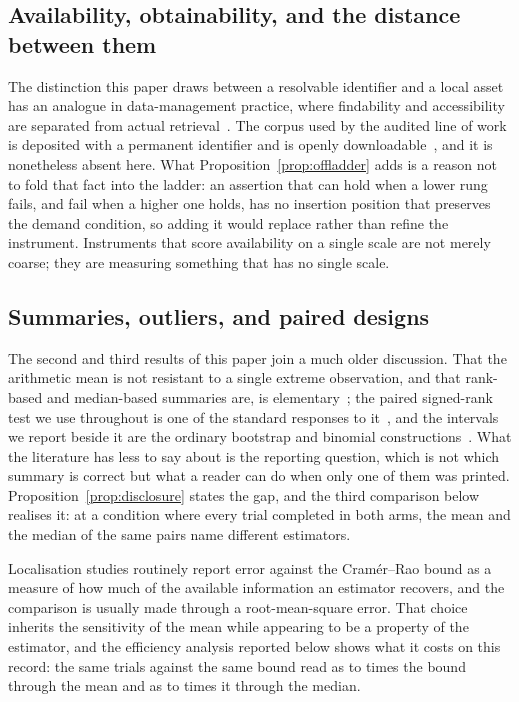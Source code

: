 \subsection{Availability, obtainability, and the distance between them}

The distinction this paper draws between a resolvable identifier and a local
asset has an analogue in data-management practice, where findability and
accessibility are separated from actual retrieval~\cite{wilkinson2016fair}. The
corpus used by the audited line of work is deposited with a permanent identifier
and is openly downloadable~\cite{locata,lollmann2018locata}, and it is
nonetheless absent here. What
Proposition~\ref{prop:offladder} adds is a reason not to fold that fact into the
ladder: an assertion that can hold when a lower rung fails, and fail when a
higher one holds, has no insertion position that preserves the demand
condition, so adding it would replace rather than refine the instrument.
Instruments that score availability on a single scale are not merely coarse;
they are measuring something that has no single scale.

\subsection{Summaries, outliers, and paired designs}

The second and third results of this paper join a much older discussion. That
the arithmetic mean is not resistant to a single extreme observation, and that
rank-based and median-based summaries are, is elementary~\cite{huber1964robust};
the paired signed-rank test we use throughout is one of the standard responses
to it~\cite{wilcoxon1945individual,dixon1946sign,dietterich1998approximate}, and
the intervals we report beside it are the ordinary bootstrap and binomial
constructions~\cite{efron1979bootstrap,clopper1934use}. What the literature has
less to say about is the reporting question, which is not which summary is
correct but what a reader can do when only one of them was printed.
Proposition~\ref{prop:disclosure} states the gap, and the third comparison below
realises it: at a condition where every trial completed in both arms, the mean
and the median of the same \CxTrialsPerCondition{} pairs name different
estimators.

Localisation studies routinely report error against the Cram\'er--Rao bound as a
measure of how much of the available information an estimator recovers, and the
comparison is usually made through a root-mean-square error. That choice
inherits the sensitivity of the mean while appearing to be a property of the
estimator, and the efficiency analysis reported below shows what it costs on this
record: the same trials against the same bound read as \CxEffMeanLow{} to
\CxEffMeanHigh{} times the bound through the mean and as \CxEffMedianLow{} to
\CxEffMedianHigh{} times it through the median.

